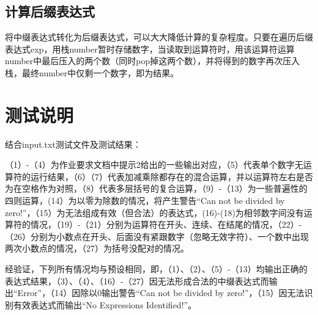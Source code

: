 \documentclass[UTF8]{ctexart}
\begin{document}
\subsection{计算后缀表达式}
将中缀表达式转化为后缀表达式，可以大大降低计算的复杂程度。只要在遍历后缀表达式exp，用栈number暂时存储数字，当读取到运算符时，用该运算符运算number中最后压入的两个数（同时pop掉这两个数），并将得到的数字再次压入栈，最终number中仅剩一个数字，即为结果。
\section{测试说明}
结合input.txt测试文件及测试结果：\par
（1）-（4）为作业要求文档中提示2给出的一些输出对应，（5）代表单个数字无运算符的运行结果，（6）（7）代表加减乘除都存在的混合运算，并以运算符左右是否为在空格作为对照，（8）代表多层括号的复合运算，（9）-（13）为一些普遍性的四则运算，(14）为以零为除数的情况，将产生警告“Can not be divided by zero!”，（15）为无法组成有效（但合法）的表达式，(16)-(18)为相邻数字间没有运算符的情况，（19）-（21）分别为运算符在开头、连续、在结尾的情况，（22）-（26）分别为小数点在开头、后面没有紧跟数字（忽略无效字符）、一个数中出现两次小数点的情况，（27）为括号没配对的情况。\par
经验证，下列所有情况均与预设相同，即，（1）、（2）、（5）-（13）均输出正确的表达式结果，（3）、（4）、（16）-（27）因无法形成合法的中缀表达式而输出“Error”，（14）因除以0输出警告“Can not be divided by zero!”，（15）因无法识别有效表达式而输出“No Expressions Identified!”。
\end{document}
